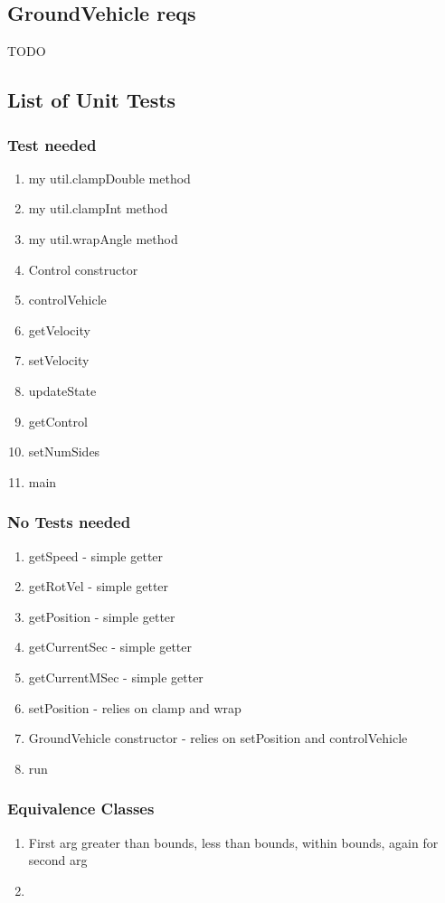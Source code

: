 \documentclass{article}
\begin{document}
\subsection{GroundVehicle reqs}
TODO
\subsection{List of Unit Tests}
\subsubsection{Test needed}
\begin{enumerate}
	\item my util.clampDouble method
	\item my util.clampInt method
	\item my util.wrapAngle method
	\item Control constructor
	\item controlVehicle
	\item getVelocity
	\item setVelocity
	\item updateState
	\item getControl
	\item setNumSides
	\item main
\end{enumerate}
\subsubsection{No Tests needed}
\begin{enumerate}
	\item getSpeed - simple getter
	\item getRotVel - simple getter
	\item getPosition - simple getter
	\item getCurrentSec - simple getter
	\item getCurrentMSec - simple getter
	\item setPosition - relies on clamp and wrap 
	\item GroundVehicle constructor - relies on setPosition and controlVehicle
	\item run
\end{enumerate}
\subsubsection{Equivalence Classes}
\begin{enumerate}
	\item First arg greater than bounds, less than bounds, within bounds, again for second arg
	\item 
\end{enumerate}
\end{document}
